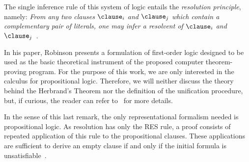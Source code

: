 The single inference rule of this system of logic entails the \emph{resolution
principle}, namely: \emph{From any two clauses} $\clause_i$ \emph{and}
$\clause_j$ \emph{which contain a complementary pair of literals, one may infer
a resolvent of} $\clause_i$ \emph{and} $\clause_j$~\cite{Robinson65}.   

In his paper, Robinson presents a formulation of first-order logic designed to
be used as the basic theoretical instrument of the proposed computer
theorem-proving program. For the purpose of this work, we are only interested in
the calculus for propositional logic. Therefore, we will neither discuss the theory
behind the Herbrand's Theorem nor the definition of the unification procedure,
but, if curious, the reader can refer to~\cite{Robinson65} for more details.

In the sense of this last remark, the only representational formalism needed is
propositional logic. As resolution has only the RES rule, a proof consists of
repeated application of this rule to the propositional clauses. These
applications are sufficient to derive an empty clause if and only if the initial
formula is unsatisfiable~\cite{satchapter}.


